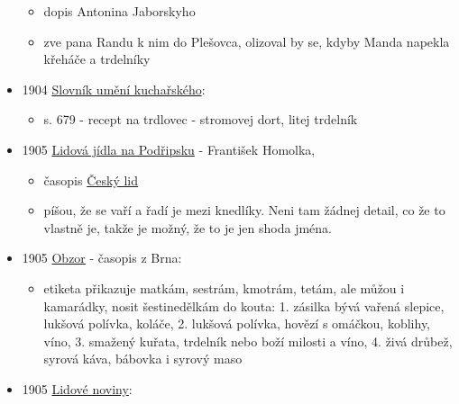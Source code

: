 \begin{itemize}
  \begin{itemize}
  \tightlist
  \item
    dopis Antonina Jaborskyho
  \item
    zve pana Randu k nim do Plešovca, olizoval by se, kdyby Manda
    napekla křeháče a trdelníky
  \end{itemize}
\item
  1904
  \href{https://ceskadigitalniknihovna.cz/view/uuid:245714d0-e323-11ec-a26a-5ef3fc9bb22f?page=uuid\%3Acacf7f15-f1a5-4cca-a344-05b1ee66b972&fulltext=trdlovec&source=nkp}{Slovník
  umění kuchařského}:

  \begin{itemize}
  \tightlist
  \item
    s. 679 - recept na trdlovec - stromovej dort, litej trdelník
  \end{itemize}
\item
  1905 \href{https://www.jstor.org/stable/42693111}{Lidová jídla na
  Podřipsku} - František Homolka,

  \begin{itemize}
  \tightlist
  \item
    časopis
    \href{https://ceskadigitalniknihovna.cz/uuid/uuid:27984073-3c0d-48de-8c3a-9b56c8b34d7a}{Český
    lid}
  \item
    píšou, že se vaří a řadí je mezi knedlíky. Neni tam žádnej detail,
    co že to vlastně je, takže je možný, že to je jen shoda jména.
  \end{itemize}
\item
  1905
  \href{https://ceskadigitalniknihovna.cz/view/uuid:89c00f20-ac41-11dd-b6fd-000d606f5dc6?page=uuid\%3A2b67a058-6dd3-4a26-8b98-58bc2dd95f6a&fulltext=trdeln\%C3\%ADk\%20OR\%20trdeln\%C3\%ADky\%20OR\%20trdeln\%C3\%ADk\%C5\%AF&source=nkp}{Obzor}
  - časopis z Brna:

  \begin{itemize}
  \tightlist
  \item
    etiketa přikazuje matkám, sestrám, kmotrám, tetám, ale můžou i
    kamarádky, nosit šestinedělkám do kouta: 1. zásilka bývá vařená
    slepice, lukšová polívka, koláče, 2. lukšová polívka, hovězí s
    omáčkou, koblihy, víno, 3. smažený kuřata, trdelník nebo boží
    milosti a víno, 4. živá drůbež, syrová káva, bábovka i syrový maso
  \end{itemize}
\item
  1905
  \href{https://ceskadigitalniknihovna.cz/uuid/uuid:b78503e3-435d-11dd-b505-00145e5790ea}{Lidové
  noviny}:


\end{itemize}

